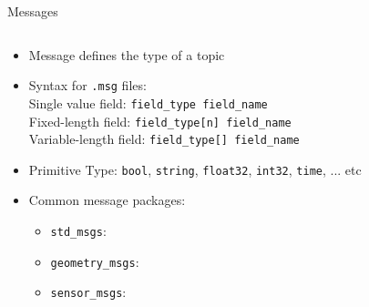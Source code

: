 \documentclass[aspectratio=43]{beamer}
\newcommand{\inline}[1]{\texttt{#1}}
\begin{document}
\begin{frame}{Messages}
	\begin{columns}
		\begin{column}{0.7\textwidth}
			\begin{itemize}
				\item Message defines the type of a topic
				\item Syntax for \texttt{.msg} files:\\%
					Single value field: \inline{field_type field_name}\\%
					Fixed-length field: \inline{field_type[n] field_name}\\%
					Variable-length field: \inline{field_type[] field_name}
				\item Primitive Type: \inline{bool}, \inline{string}, \inline{float32}, \inline{int32}, \inline{time}, ... etc
				\item Common message packages:
					\begin{itemize}
						\item \inline{std_msgs}: 
						\item \inline{geometry_msgs}:
						\item \inline{sensor_msgs}:
					\end{itemize}
			\end{itemize}
		\end{column}
		\begin{column}{0.3\textwidth}
			\centering
		\end{column}
	\end{columns}
\end{frame}
\end{document}
